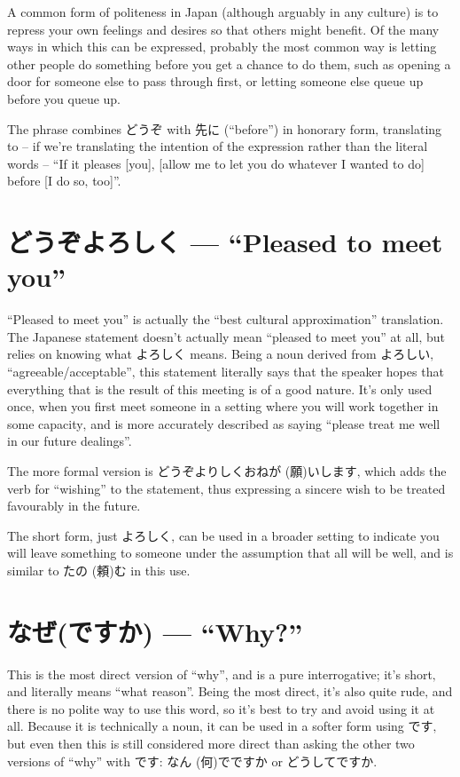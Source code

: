 \documentclass[11pt, b5paper, twoside, openright, onecolumn]{book}
\makeatletter
\newcommand*{\rubystack}[2]{{\relscale{0.5}%
  \begin{tabular}[b]{@{}c@{}}%
    {#1}\\%
   {\textscale{2}{#2}}%
  \end{tabular}}%
}
\DeclareRobustCommand*{\ruby}[2]{%
  \mbox{%
    \setlength{\parskip}{0ex}%
    \BeginAccSupp{method=pdfstringdef,ActualText={#1}}%
      \rubystack{\phantom{#2}}{#1}%
      \llap{%
        \rubystack{#2}{\phantom{#1}}%
      }%
    \EndAccSupp{}%
  }%
}
\renewcommand*{\ruby}[2]{#2 (#1)}%
\makeatother
\begin{document}
A common form of politeness in Japan (although arguably in any culture) is to repress your own feelings and desires so that others might benefit. Of the many ways in which this can be expressed‚ probably the most common way is letting other people do something before you get a chance to do them‚ such as opening a door for someone else to pass through first‚ or letting someone else queue up before you queue up.

The phrase combines どうぞ with 先に (“before”) in honorary form‚ translating to -- if we’re translating the intention of the expression rather than the literal words -- “If it pleases [you]‚ [allow me to let you do whatever I wanted to do] before [I do so‚ too]”.

\section*{どうぞよろしく — “Pleased to meet you”}

“Pleased to meet you” is actually the “best cultural approximation” translation. The Japanese statement doesn’t actually mean “pleased to meet you” at all‚ but relies on knowing what よろしく means. Being a noun derived from よろしい‚ “agreeable/acceptable”‚ this statement literally says that the speaker hopes that everything that is the result of this meeting is of a good nature. It’s only used once‚ when you first meet someone in a setting where you will work together in some capacity‚ and is more accurately described as saying “please treat me well in our future dealings”.

The more formal version is どうぞよりしくお\ruby{願}{ねが}いします‚ which adds the verb for “wishing” to the statement‚ thus expressing a sincere wish to be treated favourably in the future.

The short form‚ just よろしく‚ can be used in a broader setting to indicate you will leave something to someone under the assumption that all will be well‚ and is similar to \ruby{頼}{たの}む in this use.

\section*{なぜ(ですか) — “Why?”}

This is the most direct version of “why”‚ and is a pure interrogative; it’s short‚ and literally means “what reason”. Being the most direct‚ it’s also quite rude‚ and there is no polite way to use this word‚ so it’s best to try and avoid using it at all. Because it is technically a noun‚ it can be used in a softer form using です‚ but even then this is still considered more direct than asking the other two versions of “why” with です: \ruby{何}{なん}でですか or どうしてですか.
\end{document}
